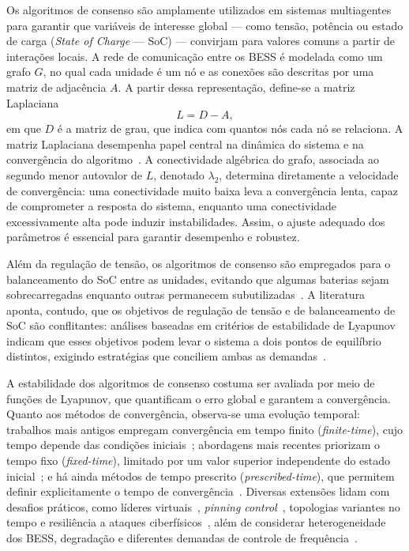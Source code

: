 Os algoritmos de consenso são amplamente utilizados em sistemas multiagentes para garantir que variáveis 
de interesse global --- como tensão, potência ou estado de carga (\emph{State of Charge} --- SoC) --- 
convirjam para valores comuns a partir de interações locais. A rede de comunicação entre os BESS é 
modelada como um grafo $G$, no qual cada unidade é um nó e as conexões são descritas por uma matriz de 
adjacência $A$. A partir dessa representação, define-se a matriz Laplaciana
\begin{equation}
  L = D - A,
  \label{eq:laplaciana}
\end{equation}
em que $D$ é a matriz de grau, que indica com quantos nós cada nó se relaciona. A matriz Laplaciana 
desempenha papel central na dinâmica do sistema e na convergência do algoritmo~\cite{tang2023}. A 
conectividade algébrica do grafo, associada ao segundo menor autovalor de $L$, denotado $\lambda_2$, 
determina diretamente a velocidade de convergência: uma conectividade muito baixa leva a convergência 
lenta, capaz de comprometer a resposta do sistema, enquanto uma conectividade excessivamente alta pode 
induzir instabilidades. Assim, o ajuste adequado dos parâmetros é essencial para garantir desempenho e 
robustez.

Além da regulação de tensão, os algoritmos de consenso são empregados para o balanceamento do SoC entre 
as unidades, evitando que algumas baterias sejam sobrecarregadas enquanto outras permanecem 
subutilizadas~\cite{li2026}. A literatura aponta, contudo, que os objetivos de regulação de tensão e de 
balanceamento de SoC são conflitantes: análises baseadas em critérios de estabilidade de Lyapunov 
indicam que esses objetivos podem levar o sistema a dois pontos de equilíbrio distintos, exigindo 
estratégias que conciliem ambas as demandas~\cite{tang2023}.

A estabilidade dos algoritmos de consenso costuma ser avaliada por meio de funções de Lyapunov, que 
quantificam o erro global e garantem a convergência. Quanto aos métodos de convergência, observa-se uma 
evolução temporal: trabalhos mais antigos empregam convergência em tempo finito (\emph{finite-time}), 
cujo tempo depende das condições iniciais~\cite{zhang2023,hu2019}; abordagens mais recentes priorizam o 
tempo fixo (\emph{fixed-time}), limitado por um valor superior independente do estado 
inicial~\cite{zeng2024,zhou2024}; e há ainda métodos de tempo prescrito (\emph{prescribed-time}), que 
permitem definir explicitamente o tempo de convergência~\cite{li2024}. Diversas extensões lidam com 
desafios práticos, como líderes virtuais~\cite{ren2022}, \emph{pinning control}~\cite{yang2018}, 
topologias variantes no tempo e resiliência a ataques ciberfísicos~\cite{zhou2024}, além de considerar 
heterogeneidade dos BESS, degradação e diferentes demandas de controle de 
frequência~\cite{wang2024,he2023}.

